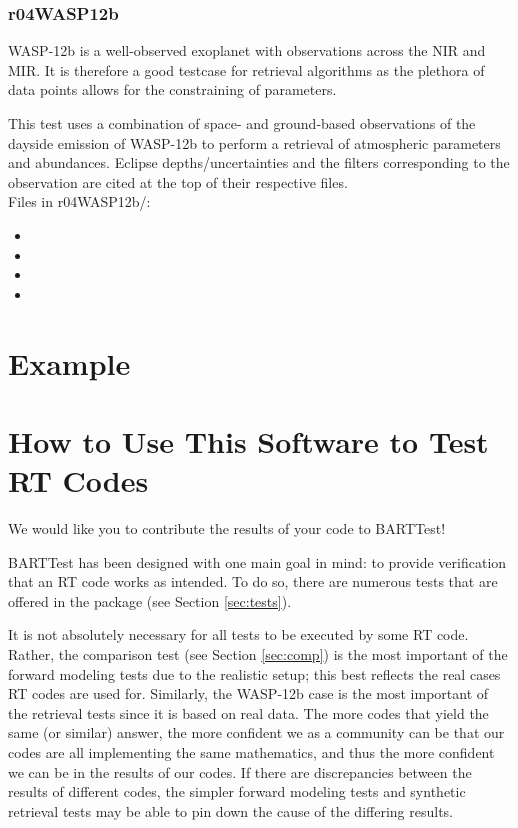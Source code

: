 \documentclass[letterpaper, 12pt]{article}
\begin{document}
\subsubsection{r04WASP12b}
WASP-12b is a well-observed exoplanet with observations across the NIR and MIR. 
It is therefore a good testcase for retrieval algorithms as the plethora of 
data points allows for the constraining of parameters. 

This test uses a combination of space- and ground-based observations of the 
dayside emission of WASP-12b to perform a retrieval of atmospheric parameters 
and abundances. Eclipse depths/uncertainties and the filters corresponding to 
the observation are cited at the top of their respective files.\\

Files in r04WASP12b/:
\begin{itemize} \itemsep0pt
  \item 
  \item 
  \item 
  \item 
\end{itemize}


\section{Example}
\label{sec:example}


\section{How to Use This Software to Test RT Codes}
\label{sec:howto}
We would like you to contribute the results of your code to BARTTest! 

BARTTest has been designed with one main goal in mind: to provide verification 
that an RT code works as intended. To do so, there are numerous tests that are 
offered in the package (see Section \ref{sec:tests}).

It is not absolutely necessary for all tests to be executed by some RT code. 
Rather, the comparison test (see Section \ref{sec:comp}) is the most important 
of the forward modeling tests due to the realistic setup; this best reflects 
the real cases RT codes are used for. Similarly, the WASP-12b case is the most 
important of the retrieval tests since it is based on real data. The more 
codes that yield the same (or similar) answer, the more confident we as a 
community can be that our codes are all implementing the same mathematics, 
and thus the more confident we can be in the results of our codes. If there 
are discrepancies between the results of different codes, the simpler forward 
modeling tests and synthetic retrieval tests may be able to pin down the cause 
of the differing results.
\end{document}
